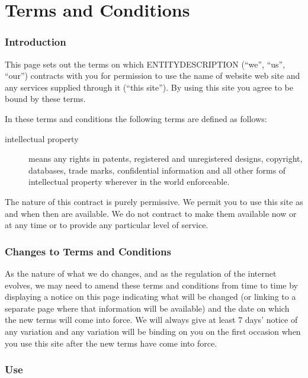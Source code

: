 \section{Terms and Conditions}

\subsubsection{Introduction}

This page sets out the terms on which ENTITYDESCRIPTION (``we'', ``us'',
``our'') contracts with you for permission to use the {name of website}
web site and any services supplied through it (``this site''). By using
this site you agree to be bound by these terms.

In these terms and conditions the following terms are defined as
follows:

\begin{description}
\item[intellectual property]
means any rights in patents, registered and unregistered designs,
copyright, databases, trade marks, confidential information and all
other forms of intellectual property wherever in the world enforceable.
\end{description}

The nature of this contract is purely permissive. We permit you to use
this site as and when then are available. We do not contract to make
them available now or at any time or to provide any particular level of
service.

\subsubsection{Changes to Terms and Conditions}

As the nature of what we do changes, and as the regulation of the
internet evolves, we may need to amend these terms and conditions from
time to time by displaying a notice on this page indicating what will be
changed (or linking to a separate page where that information will be
available) and the date on which the new terms will come into force. We
will always give at least 7 days' notice of any variation and any
variation will be binding on you on the first occasion when you use this
site after the new terms have come into force.

\subsubsection{Use}

